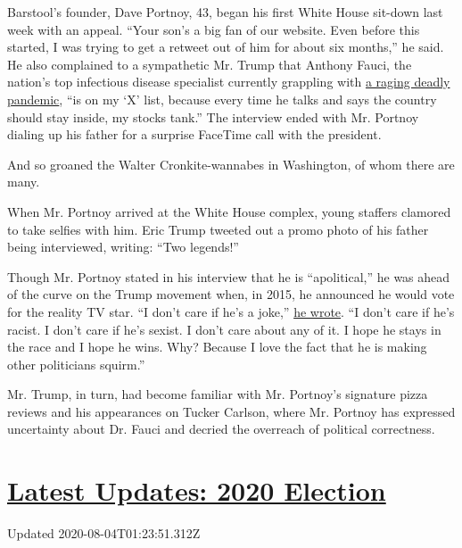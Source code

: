 Barstool's founder, Dave Portnoy, 43, began his first White House
sit-down last week with an appeal. ``Your son's a big fan of our
website. Even before this started, I was trying to get a retweet out of
him for about six months,'' he said. He also complained to a sympathetic
Mr. Trump that Anthony Fauci, the nation's top infectious disease
specialist currently grappling with
\href{https://www.nytimes3xbfgragh.onion/interactive/2020/us/coronavirus-us-cases.html}{a
raging deadly pandemic}, ``is on my `X' list, because every time he
talks and says the country should stay inside, my stocks tank.'' The
interview ended with Mr. Portnoy dialing up his father for a surprise
FaceTime call with the president.

And so groaned the Walter Cronkite-wannabes in Washington, of whom there
are many.

When Mr. Portnoy arrived at the White House complex, young staffers
clamored to take selfies with him. Eric Trump tweeted out a promo photo
of his father being interviewed, writing: ``Two legends!''

Though Mr. Portnoy stated in his interview that he is ``apolitical,'' he
was ahead of the curve on the Trump movement when, in 2015, he announced
he would vote for the reality TV star. ``I don't care if he's a joke,''
\href{https://www.barstoolsports.com/blog/351804/im-officially-voting-for-donald-trump}{he
wrote}. ``I don't care if he's racist. I don't care if he's sexist. I
don't care about any of it. I hope he stays in the race and I hope he
wins. Why? Because I love the fact that he is making other politicians
squirm.''

Mr. Trump, in turn, had become familiar with Mr. Portnoy's signature
pizza reviews and his appearances on Tucker Carlson, where Mr. Portnoy
has expressed uncertainty about Dr. Fauci and decried the overreach of
political correctness.

\hypertarget{latest-updates-2020-election}{%
\section{\texorpdfstring{\href{https://www.nytimes3xbfgragh.onion/2020/08/03/us/elections/biden-vs-trump.html?action=click\&pgtype=Article\&state=default\&region=MAIN_CONTENT_1\&context=storylines_live_updates}{Latest
Updates: 2020
Election}}{Latest Updates: 2020 Election}}\label{latest-updates-2020-election}}

Updated 2020-08-04T01:23:51.312Z

